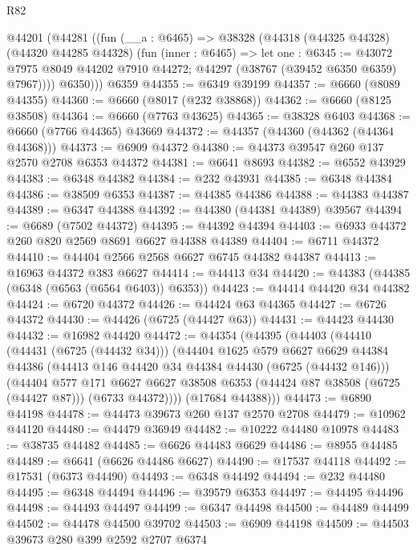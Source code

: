 \begin{lexlean}{R82}
\begin{coremodule}
    @44201
      (@44281
        ((fun (__a : @6465) =>
        @38328
          (@44318
            (@44325 @44328)
            (@44320 @44285 @44328)
            (fun (inner : @6465) =>
            let one : @6345 := @43072 @7975 @8049 @44202 @7910 @44272;
            @44297 (@38767 (@39452 @6350 @6359) @7967))))
          @6350)))
    @6359
@44355 := @6349 @39199
@44357 := @6660 (@8089 @44355)
@44360 := @6660 (@8017 (@232 @38868))
@44362 := @6660 (@8125 @38508)
@44364 := @6660 (@7763 @43625)
@44365 := @38328 @6403
@44368 := @6660 (@7766 @44365) @43669
@44372 := @44357 (@44360 (@44362 (@44364 @44368)))
@44373 := @6909 @44372
@44380 := @44373 @39547 @260 @137 @2570 @2708 @6353 @44372
@44381 := @6641 @8693
@44382 := @6552 @43929
@44383 := @6348 @44382
@44384 := @232 @43931
@44385 := @6348 @44384
@44386 := @38509 @6353
@44387 := @44385 @44386
@44388 := @44383 @44387
@44389 := @6347 @44388
@44392 := @44380 (@44381 @44389) @39567
@44394 := @6689 (@7502 @44372)
@44395 := @44392 @44394
@44403 := @6933 @44372 @260 @820 @2569 @8691 @6627 @44388 @44389
@44404 := @6711 @44372
@44410 := @44404 @2566 @2568 @6627 @6745 @44382 @44387
@44413 := @16963 @44372 @383 @6627
@44414 := @44413 @34
@44420 := @44383 (@44385 (@6348 (@6563 (@6564 @6403)) @6353))
@44423 := @44414 @44420 @34 @44382
@44424 := @6720 @44372
@44426 := @44424 @63 @44365
@44427 := @6726 @44372
@44430 := @44426 (@6725 (@44427 @63))
@44431 := @44423 @44430
@44432 := @16982 @44420
@44472 := @44354
    (@44395
      (@44403
        (@44410
          (@44431 (@6725 (@44432 @34)))
          (@44404
            @1625
            @579
            @6627
            @6629
            @44384
            @44386
            (@44413 @146 @44420 @34 @44384 @44430 (@6725 (@44432 @146)))
            (@44404
              @577
              @171
              @6627
              @6627
              @38508
              @6353
              (@44424 @87 @38508 (@6725 (@44427 @87)))
              (@6733 @44372))))
        (@17684 @44388)))
@44473 := @6890 @44198
@44478 := @44473 @39673 @260 @137 @2570 @2708
@44479 := @10962 @44120
@44480 := @44479 @36949
@44482 := @10222 @44480 @10978
@44483 := @38735 @44482
@44485 := @6626 @44483 @6629
@44486 := @8955 @44485
@44489 := @6641 (@6626 @44486 @6627)
@44490 := @17537 @44118
@44492 := @17531 (@6373 @44490)
@44493 := @6348 @44492
@44494 := @232 @44480
@44495 := @6348 @44494
@44496 := @39579 @6353
@44497 := @44495 @44496
@44498 := @44493 @44497
@44499 := @6347 @44498
@44500 := @44489 @44499
@44502 := @44478 @44500 @39702
@44503 := @6909 @44198
@44509 := @44503 @39673 @280 @399 @2592 @2707 @6374

\end{coremodule}
\end{lexlean}
